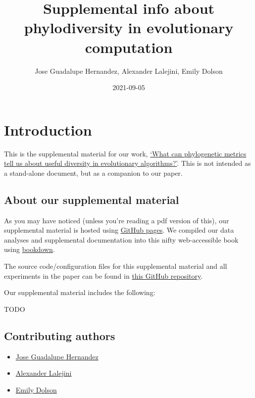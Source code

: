 \documentclass[]{book}
\title{Supplemental info about phylodiversity in evolutionary computation}
\author{Jose Guadalupe Hernandez, Alexander Lalejini, Emily Dolson}
\date{2021-09-05}
\providecommand{\tightlist}{%
  \setlength{\itemsep}{0pt}\setlength{\parskip}{0pt}}
\begin{document}
\maketitle

{
\setcounter{tocdepth}{1}
\tableofcontents
}
\hypertarget{introduction}{%
\chapter{Introduction}\label{introduction}}

This is the supplemental material for our work, \href{https://arxiv.org/abs/2108.12586}{`What can phylogenetic metrics tell us about useful diversity in evolutionary algorithms?'}.
This is not intended as a stand-alone document, but as a companion to our paper.

\hypertarget{about-our-supplemental-material}{%
\section{About our supplemental material}\label{about-our-supplemental-material}}

As you may have noticed (unless you're reading a pdf version of this), our supplemental material is hosted using \href{https://pages.github.com/}{GitHub pages}.
We compiled our data analyses and supplemental documentation into this nifty web-accessible book using \href{https://bookdown.org}{bookdown}.

The source code/configuration files for this supplemental material and all experiments in the paper can be found in \href{https://github.com/emilydolson/phylodiversity-metrics-in-EC-GPTP-2021}{this GitHub repository}.

Our supplemental material includes the following:

TODO

\hypertarget{contributing-authors}{%
\section{Contributing authors}\label{contributing-authors}}

\begin{itemize}
\tightlist
\item
  \href{https://jgh9094.github.io/}{Jose Guadalupe Hernandez}
\item
  \href{https://lalejini.com/}{Alexander Lalejini}
\item
  \href{http://emilyldolson.com/}{Emily Dolson}
\end{itemize}
\end{document}
